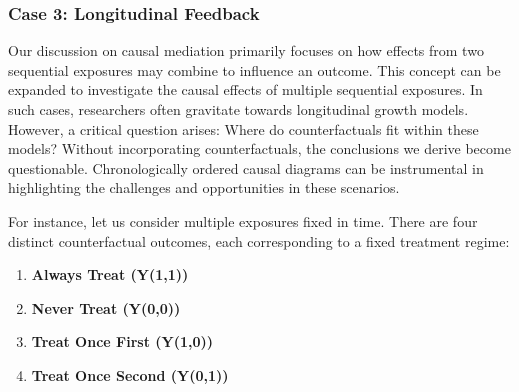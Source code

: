 \documentclass[
  singlecolumn,
  9pt]{article}
\providecommand{\tightlist}{%
  \setlength{\itemsep}{0pt}\setlength{\parskip}{0pt}}\usepackage{longtable,booktabs,array}
\begin{document}
\subsubsection{Case 3: Longitudinal
Feedback}\label{case-3-longitudinal-feedback}

Our discussion on causal mediation primarily focuses on how effects from
two sequential exposures may combine to influence an outcome. This
concept can be expanded to investigate the causal effects of multiple
sequential exposures. In such cases, researchers often gravitate towards
longitudinal growth models. However, a critical question arises: Where
do counterfactuals fit within these models? Without incorporating
counterfactuals, the conclusions we derive become questionable.
Chronologically ordered causal diagrams can be instrumental in
highlighting the challenges and opportunities in these scenarios.

For instance, let us consider multiple exposures fixed in time. There
are four distinct counterfactual outcomes, each corresponding to a fixed
treatment regime:

\begin{enumerate}
\def\labelenumi{\arabic{enumi}.}
\tightlist
\item
  \textbf{Always Treat (Y(1,1))}
\item
  \textbf{Never Treat (Y(0,0))}
\item
  \textbf{Treat Once First (Y(1,0))}
\item
  \textbf{Treat Once Second (Y(0,1))}
\end{enumerate}
\end{document}
